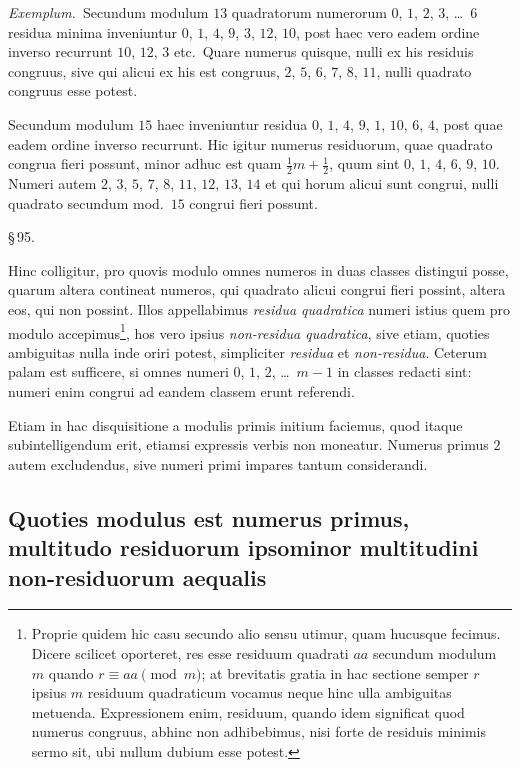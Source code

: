 \documentclass[12pt,a4paper]{article}
\theoremstyle{plain}
\theoremstyle{definition}
\theoremstyle{remark}
\begin{document}
\textit{Exemplum.}\ Secundum modulum $13$ quadratorum numerorum $0$, $1$, $2$, $3$, \dots\ $6$ residua minima inveniuntur $0$, $1$, $4$, $9$, $3$, $12$, $10$, post haec vero eadem ordine inverso recurrunt $10$, $12$, $3$ etc.\ Quare numerus quisque, nulli ex his residuis congruus, sive qui alicui ex his est congruus, $2$, $5$, $6$, $7$, $8$, $11$, nulli quadrato congruus esse potest.

Secundum modulum $15$ haec inveniuntur residua $0$, $1$, $4$, $9$, $1$, $10$, $6$, $4$, post quae eadem ordine inverso recurrunt. Hic igitur numerus residuorum, quae quadrato congrua fieri possunt, minor adhuc est quam $\frac{1}{2}m + \frac{1}{2}$, quum sint $0$, $1$, $4$, $6$, $9$, $10$. Numeri autem $2$, $3$, $5$, $7$, $8$, $11$, $12$, $13$, $14$ et qui horum alicui sunt congrui, nulli quadrato secundum mod.\ $15$ congrui fieri possunt.

\begin{center}\S\,95.\end{center}

Hinc colligitur, pro quovis modulo omnes numeros in duas classes distingui posse, quarum altera contineat numeros, qui quadrato alicui congrui fieri possint, altera eos, qui non possint. Illos appellabimus \emph{residua quadratica} numeri istius quem pro modulo accepimus\footnote{Proprie quidem hic casu secundo alio sensu utimur, quam hucusque fecimus. Dicere scilicet oporteret, res esse residuum quadrati $aa$ secundum modulum $m$ quando $r \equiv aa \pmod{m}$; at brevitatis gratia in hac sectione semper $r$ ipsius $m$ residuum quadraticum vocamus neque hinc ulla ambiguitas metuenda. Expressionem enim, residuum, quando idem significat quod numerus congruus, abhinc non adhibebimus, nisi forte de residuis minimis sermo sit, ubi nullum dubium esse potest.}, hos vero ipsius \emph{non-residua quadratica}, sive etiam, quoties ambiguitas nulla inde oriri potest, simpliciter \emph{residua} et \emph{non-residua}. Ceterum palam est sufficere, si omnes numeri $0$, $1$, $2$, \dots\ $m-1$ in classes redacti sint: numeri enim congrui ad eandem classem erunt referendi.

Etiam in hac disquisitione a modulis primis initium faciemus, quod itaque subintelligendum erit, etiamsi expressis verbis non moneatur. Numerus primus $2$ autem excludendus, sive numeri primi impares tantum considerandi.

\subsection*{Quoties modulus est numerus primus, multitudo residuorum ipsominor multitudini non-residuorum aequalis}
\end{document}
